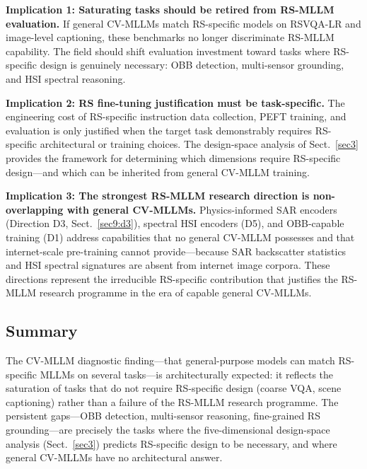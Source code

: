 \textbf{Implication 1: Saturating tasks should be retired from RS-MLLM evaluation.}
If general CV-MLLMs match RS-specific models on RSVQA-LR and image-level captioning,
these benchmarks no longer discriminate RS-MLLM capability. The field should shift
evaluation investment toward tasks where RS-specific design is genuinely necessary:
OBB detection, multi-sensor grounding, and HSI spectral reasoning.

\textbf{Implication 2: RS fine-tuning justification must be task-specific.}
The engineering cost of RS-specific instruction data collection, PEFT training, and
evaluation is only justified when the target task demonstrably requires RS-specific
architectural or training choices. The design-space analysis of Sect.~\ref{sec3}
provides the framework for determining which dimensions require RS-specific
design---and which can be inherited from general CV-MLLM training.

\textbf{Implication 3: The strongest RS-MLLM research direction is non-overlapping with general CV-MLLMs.}
Physics-informed SAR encoders (Direction D3, Sect.~\ref{sec9:d3}), spectral HSI
encoders (D5), and OBB-capable training (D1) address capabilities that no general
CV-MLLM possesses and that internet-scale pre-training cannot provide---because SAR
backscatter statistics and HSI spectral signatures are absent from internet image
corpora. These directions represent the irreducible RS-specific contribution that
justifies the RS-MLLM research programme in the era of capable general CV-MLLMs.

\subsection*{Summary}

The CV-MLLM diagnostic finding---that general-purpose models can match
RS-specific MLLMs on several tasks---is architecturally expected: it reflects
the saturation of tasks that do not require RS-specific design (coarse VQA,
scene captioning) rather than a failure of the RS-MLLM research programme.
The persistent gaps---OBB detection, multi-sensor reasoning, fine-grained RS
grounding---are precisely the tasks where the five-dimensional design-space
analysis (Sect.~\ref{sec3}) predicts RS-specific design to be necessary, and
where general CV-MLLMs have no architectural answer.


